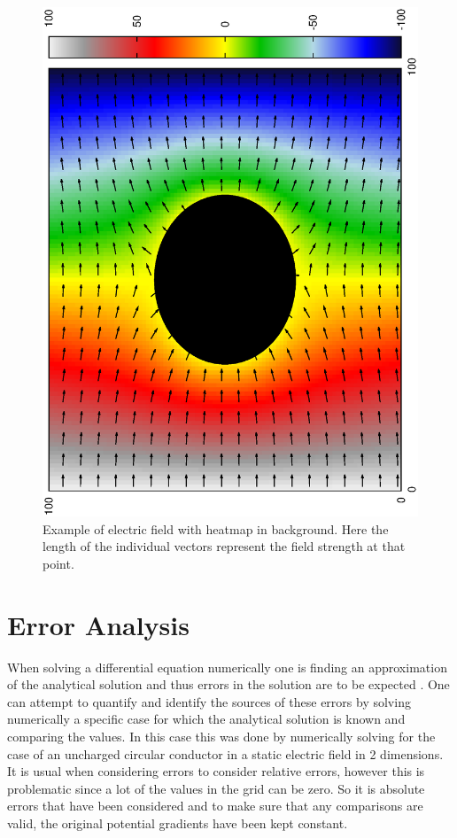 \documentclass[aps,twocolumn,pre,nofootinbib,10pt]{revtex4-1}
\begin{document}
\begin{figure}[h]
\begin{center}
\includegraphics[height=\breite \columnwidth,angle=-90]{efield.ps}
\caption{Example of electric field with heatmap in background. Here the length of the individual vectors represent the field strength at that point.}
\label{efield}
\end{center}
\end{figure}


\section{Error Analysis \label{sec:unc}}

When solving a differential equation numerically one is finding an approximation of the analytical solution and thus errors in the solution are to be expected \cite{compmethods}.
One can attempt to quantify and identify the sources of these errors by solving numerically a specific case for which the analytical solution is known and comparing the values. In this case this was done by numerically solving for the case of an uncharged circular conductor in a static electric field in 2 dimensions. It is usual when considering errors to consider relative errors, however this is problematic since a lot of the values in the grid can be zero. So it is absolute errors that have been considered and to make sure that any comparisons are valid, the original potential gradients have been kept constant.
\end{document}
